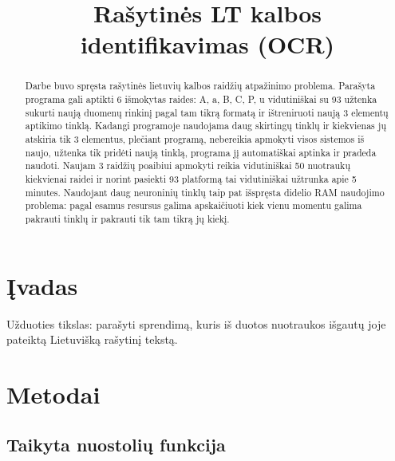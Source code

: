 \documentclass[conference]{IEEEtran}
\begin{document}
\title{Rašytinės LT kalbos identifikavimas (OCR)}

\author{
}

\maketitle

\begin{abstract}
Darbe buvo spręsta rašytinės lietuvių kalbos raidžių atpažinimo problema.
Parašyta programa gali aptikti 6 išmokytas raides: A, a, B, C, P, u vidutiniškai su
93%
užtenka sukurti naują duomenų rinkinį pagal tam tikrą formatą ir ištreniruoti naują
3 elementų aptikimo tinklą. Kadangi programoje naudojama daug skirtingų tinklų ir kiekvienas
jų atskiria tik 3 elementus, plečiant programą, nebereikia apmokyti visos sistemos iš naujo,
užtenka tik pridėti naują tinklą, programa jį automatiškai aptinka ir pradeda naudoti.
Naujam 3 raidžių poaibiui apmokyti reikia vidutiniškai 50 nuotraukų kiekvienai raidei ir
norint pasiekti 93%
platformą tai vidutiniškai užtrunka apie 5 minutes. Naudojant daug neuroninių tinklų
taip pat išspręsta didelio RAM naudojimo problema: pagal esamus resursus galima
apskaičiuoti kiek vienu momentu galima pakrauti tinklų ir pakrauti tik tam tikrą jų
kiekį.
\end{abstract}

\section{Įvadas}
Užduoties tikslas: parašyti sprendimą, kuris iš duotos
nuotraukos išgautų joje pateiktą Lietuvišką rašytinį tekstą.

\section{Metodai}

\subsection{Taikyta nuostolių funkcija}
\end{document}

